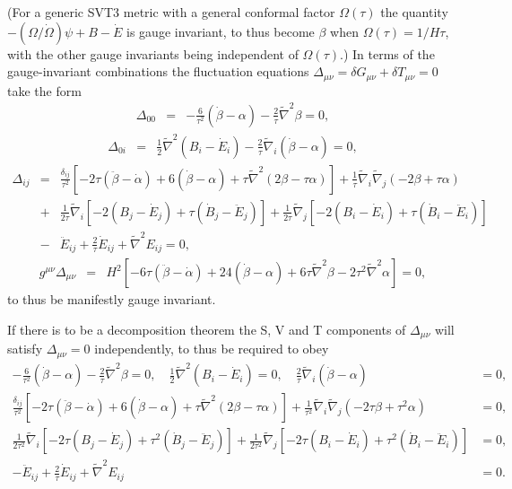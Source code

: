 \documentclass[aps,onecolumn,10pt]{revtex4}
\numberwithin{equation}{section}
\numberwithin{equation}{section}
\begin{document}
%
(For a generic SVT3 metric with a general conformal factor $\Omega(\tau)$ the quantity $-(\Omega/\dot{\Omega})\psi+B-\dot{E}$ is gauge invariant, to thus become $\beta$ when $\Omega(\tau)=1/H\tau$, with the other gauge invariants being independent of $\Omega(\tau)$.)
In terms of the gauge-invariant combinations the fluctuation equations $\Delta_{\mu\nu}=\delta G_{\mu\nu}+\delta T_{\mu\nu}=0$ take the form
%
\begin{eqnarray}
 \Delta_{00}&=&-\frac{6}{\tau^2}(\dot{\beta}-\alpha)-\frac{2}{\tau}\tilde{\nabla}^2\beta=0,
\label{7.4}
\end{eqnarray}
%
\begin{eqnarray}
 \Delta_{0i}&=&\frac{1}{2}\tilde{\nabla}^2(B_i-\dot{E}_i)-\frac{2}{\tau}\tilde{\nabla}_i(\dot{\beta}-\alpha)=0,
\label{7.5}
\end{eqnarray}
%
\begin{eqnarray}
 \Delta_{ij}&=&\frac{\delta_{ij}}{\tau^2}\left[-2\tau(\ddot{\beta}-\dot{\alpha})+6(\dot{\beta}-\alpha)+\tau \tilde{\nabla}^2(2\beta-\tau \alpha)\right]
+\frac{1}{\tau}\tilde{\nabla}_i\tilde{\nabla}_j(-2 \beta +\tau\alpha)
\nonumber\\
&+&\frac{1}{2\tau}\tilde{\nabla}_i[-2(B_j-\dot{E}_j)+\tau(\dot{B}_j-\ddot{E}_j)]
+\frac{1}{2\tau}\tilde{\nabla}_j[-2(B_i-\dot{E}_i)+\tau(\dot{B}_i-\ddot{E}_i)]
\nonumber\\
&-&\ddot{E}_{ij}+\frac{2}{\tau}\dot{E}_{ij}+\tilde{\nabla}^2E_{ij}=0,
\label{7.6}
\end{eqnarray}
%
\begin{eqnarray}
g^{\mu\nu}\Delta_{\mu\nu}&=&H^2[-6\tau(\ddot{\beta}-\dot{\alpha})+24(\dot{\beta}-\alpha)
+6\tau \tilde{\nabla}^2\beta-2\tau^2\tilde{\nabla}^2\alpha]=0,
\label{7.7}
\end{eqnarray}
%
to thus be manifestly gauge invariant.

If there is to be a decomposition theorem the S, V and T components of $\Delta_{\mu\nu}$ will satisfy $\Delta_{\mu\nu}=0$ independently, to thus be required to obey
%
\begin{align}
-\frac{6}{\tau^2}(\dot{\beta}-\alpha)-\frac{2}{\tau}\tilde{\nabla}^2\beta=0,\quad \frac{1}{2}\tilde{\nabla}^2(B_i-\dot{E}_i)=0, \quad \frac{2}{\tau}\tilde{\nabla}_i(\dot{\beta}-\alpha)&=0,
\nonumber\\
\frac{\delta_{ij}}{\tau^2}\left[-2\tau(\ddot{\beta}-\dot{\alpha})+6(\dot{\beta}-\alpha)+\tau \tilde{\nabla}^2(2\beta-\tau\alpha)\right]+ \frac{1}{\tau^2}\tilde{\nabla}_i\tilde{\nabla}_j(-2\tau \beta +\tau^2\alpha)&=0,
\nonumber\\
\frac{1}{2\tau^2}\tilde{\nabla}_i[-2\tau (B_j-\dot{E}_j)+\tau^2(\dot{B}_j-\ddot{E}_j)]
+\frac{1}{2\tau^2}\tilde{\nabla}_j[-2\tau (B_i-\dot{E}_i)+\tau^2(\dot{B}_i-\ddot{E}_i)]&=0,
\nonumber\\
-\ddot{E}_{ij}+\frac{2}{\tau}\dot{E}_{ij}+\tilde{\nabla}^2E_{ij}&=0.
\label{7.8}
\end{align}
%
\end{document}
